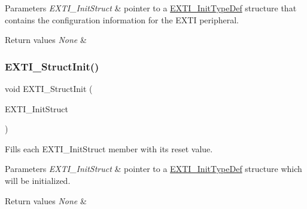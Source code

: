 \begin{DoxyParams}{Parameters}
{\em E\+X\+T\+I\+\_\+\+Init\+Struct} & pointer to a \mbox{\hyperlink{struct_e_x_t_i___init_type_def}{E\+X\+T\+I\+\_\+\+Init\+Type\+Def}} structure that contains the configuration information for the E\+X\+TI peripheral. \\
\hline
\end{DoxyParams}

\begin{DoxyRetVals}{Return values}
{\em None} & \\
\hline
\end{DoxyRetVals}
\mbox{\label{group___e_x_t_i___exported___functions_ga86b9e662d18a2f829999cfb26aa7ca20}} 
\subsubsection{\texorpdfstring{EXTI\_StructInit()}{EXTI\_StructInit()}}
{\footnotesize\ttfamily void E\+X\+T\+I\+\_\+\+Struct\+Init (\begin{DoxyParamCaption}\item[{\mbox{\hyperlink{struct_e_x_t_i___init_type_def}{E\+X\+T\+I\+\_\+\+Init\+Type\+Def}} $\ast$}]{E\+X\+T\+I\+\_\+\+Init\+Struct }\end{DoxyParamCaption})}



Fills each E\+X\+T\+I\+\_\+\+Init\+Struct member with its reset value. 


\begin{DoxyParams}{Parameters}
{\em E\+X\+T\+I\+\_\+\+Init\+Struct} & pointer to a \mbox{\hyperlink{struct_e_x_t_i___init_type_def}{E\+X\+T\+I\+\_\+\+Init\+Type\+Def}} structure which will be initialized. \\
\hline
\end{DoxyParams}

\begin{DoxyRetVals}{Return values}
{\em None} & \\
\hline
\end{DoxyRetVals}
